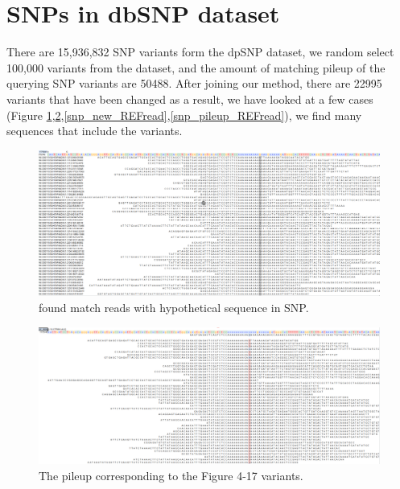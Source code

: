 \section{SNPs in dbSNP dataset}

There are 15,936,832 SNP variants form the dpSNP dataset, we random select 100,000 variants from the dataset, and the amount of matching pileup of the querying SNP variants are 50488. After joining our method, there are 22995 variants that have been changed as a result, we have looked at a few cases (Figure \ref{snp_new_ALTread},\ref{snp_pileup_ALTread},\ref{snp_new_REFread},\ref{snp_pileup_REFread}), we find many sequences that include the variants.

\vspace{0.5cm}
\begin{figure}[H]
    \centering
    \includegraphics[width=1\columnwidth]{body/image/snp_new_ALTread.png}
    \captionsetup{labelfont=bf}
    \renewcommand{\baselinestretch}{1.0}
    \vspace{-1cm}
    \caption[SNP match reads]{ found match reads with hypothetical sequence in SNP.}
    \label{snp_new_ALTread}
\end{figure}

\vspace{0.5cm}
\begin{figure}[H]
    \centering
    \includegraphics[width=1\columnwidth]{body/image/snp_pileup_ALTread.png}
    \captionsetup{labelfont=bf}
    \renewcommand{\baselinestretch}{1.0}
    \vspace{-1cm}
    \caption[Figure 4.17 pileup]{ The pileup corresponding to the Figure 4-17 variants.}
    \label{snp_pileup_ALTread}
\end{figure}

